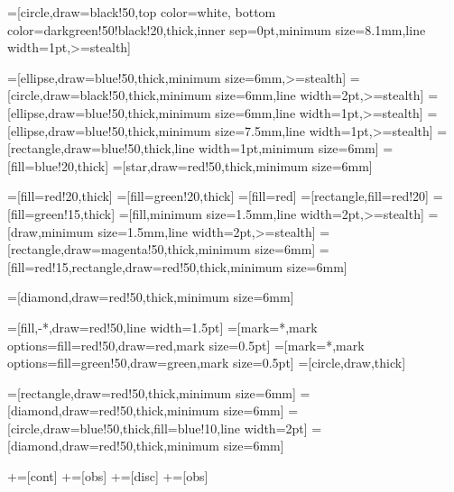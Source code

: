 =[circle,draw=black!50,top color=white, %
bottom color=darkgreen!50!black!20,thick,inner sep=0pt,minimum size=8.1mm,line width=1pt,>=stealth]  %

=[ellipse,draw=blue!50,thick,minimum size=6mm,>=stealth]  %
=[circle,draw=black!50,thick,minimum size=6mm,line width=2pt,>=stealth]  %
=[ellipse,draw=blue!50,thick,minimum size=6mm,line width=1pt,>=stealth]  %
=[ellipse,draw=blue!50,thick,minimum size=7.5mm,line width=1pt,>=stealth]  %
=[rectangle,draw=blue!50,thick,line width=1pt,minimum size=6mm]  %
=[fill=blue!20,thick]  %
=[star,draw=red!50,thick,minimum size=6mm]  %

=[fill=red!20,thick]  %
=[fill=green!20,thick]  %
=[fill=red]  %
=[rectangle,fill=red!20]  %
=[fill=green!15,thick]  %
=[fill,minimum size=1.5mm,line width=2pt,>=stealth]
=[draw,minimum size=1.5mm,line width=2pt,>=stealth]
=[rectangle,draw=magenta!50,thick,minimum size=6mm]  %
=[fill=red!15,rectangle,draw=red!50,thick,minimum size=6mm]  %

=[diamond,draw=red!50,thick,minimum size=6mm]  %

=[fill,-*,draw=red!50,line width=1.5pt]
=[mark=*,mark options={fill=red!50,draw=red},mark size=0.5pt]
=[mark=*,mark options={fill=green!50,draw=green},mark size=0.5pt]
=[circle,draw,thick]  %

=[rectangle,draw=red!50,thick,minimum size=6mm]  %
=[diamond,draw=red!50,thick,minimum size=6mm]  %
=[circle,draw=blue!50,thick,fill=blue!10,line width=2pt]  %
=[diamond,draw=red!50,thick,minimum size=6mm]  %

+=[cont]
+=[obs]
+=[disc]
+=[obs]

